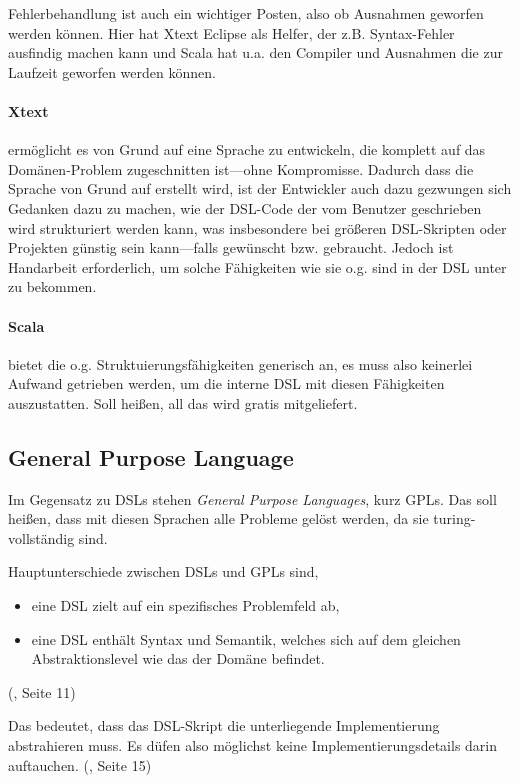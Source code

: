 Fehlerbehandlung ist auch ein wichtiger Posten, also ob Ausnahmen
geworfen werden können. Hier hat Xtext Eclipse als Helfer, der
z.B. Syntax-Fehler ausfindig machen kann und Scala hat u.a. den Compiler
und Ausnahmen die zur Laufzeit geworfen werden können.

\paragraph{Xtext} ermöglicht es von Grund auf eine Sprache zu entwickeln,
die komplett auf das Domänen-Problem zugeschnitten ist---ohne Kompromisse.
Dadurch dass die Sprache von Grund auf erstellt wird, ist der Entwickler
auch dazu gezwungen sich Gedanken dazu zu machen, wie der DSL-Code
der vom Benutzer geschrieben wird strukturiert werden kann,
was insbesondere bei größeren DSL-Skripten oder
Projekten günstig sein kann---falls gewünscht bzw. gebraucht.
Jedoch ist Handarbeit erforderlich, um solche Fähigkeiten wie sie o.g.
sind in der DSL unter zu bekommen.

\paragraph{Scala} bietet die o.g. Struktuierungsfähigkeiten generisch an,
es muss also keinerlei Aufwand getrieben werden, um die interne DSL mit
diesen Fähigkeiten auszustatten. Soll heißen, all das wird gratis mitgeliefert.


\subsection{General Purpose Language}\label{sec-gpl}

Im Gegensatz zu DSLs stehen \emph{General Purpose Languages}, kurz GPLs.
Das soll heißen, dass mit diesen Sprachen alle Probleme gelöst werden, da
sie turing-vollständig sind.

Hauptunterschiede zwischen DSLs und GPLs sind,

\begin{itemize}
  \item eine DSL zielt auf ein spezifisches Problemfeld ab,
  \item eine DSL enthält Syntax und Semantik, welches sich auf dem gleichen
        Abstraktionslevel wie das der Domäne befindet.
\end{itemize}

(\cite{dsls}, Seite 11)

Das bedeutet, dass das DSL-Skript die unterliegende Implementierung abstrahieren
muss. Es düfen also möglichst keine Implementierungsdetails darin auftauchen.
(\cite{dsls}, Seite 15)

